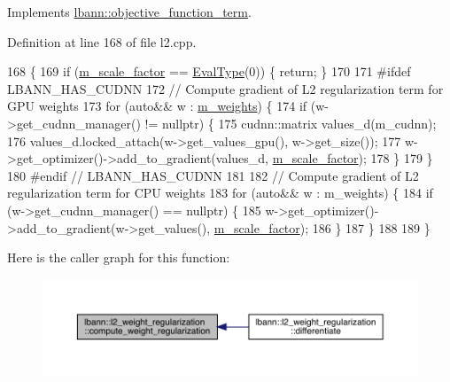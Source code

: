 Implements \hyperlink{classlbann_1_1objective__function__term_a134cf89caed45527bbe9d811a0b93dfc}{lbann\+::objective\+\_\+function\+\_\+term}.



Definition at line 168 of file l2.\+cpp.


\begin{DoxyCode}
168                                                              \{
169   \textcolor{keywordflow}{if} (\hyperlink{classlbann_1_1objective__function__term_a59a544b8ff0455ed5091de3bf0d81c3c}{m\_scale\_factor} == \hyperlink{base_8hpp_a3266f5ac18504bbadea983c109566867}{EvalType}(0)) \{ \textcolor{keywordflow}{return}; \}
170 
171 \textcolor{preprocessor}{#ifdef LBANN\_HAS\_CUDNN}
172   \textcolor{comment}{// Compute gradient of L2 regularization term for GPU weights}
173   \textcolor{keywordflow}{for} (\textcolor{keyword}{auto}&& w : \hyperlink{classlbann_1_1objective__function__term_a1d601c29153ae9cb54c585887608f2bf}{m\_weights}) \{
174     \textcolor{keywordflow}{if} (w->get\_cudnn\_manager() != \textcolor{keyword}{nullptr}) \{
175       cudnn::matrix values\_d(m\_cudnn);
176       values\_d.locked\_attach(w->get\_values\_gpu(), w->get\_size());
177       w->get\_optimizer()->add\_to\_gradient(values\_d, \hyperlink{classlbann_1_1objective__function__term_a59a544b8ff0455ed5091de3bf0d81c3c}{m\_scale\_factor});
178     \}
179   \}
180 \textcolor{preprocessor}{#endif // LBANN\_HAS\_CUDNN}
181 
182   \textcolor{comment}{// Compute gradient of L2 regularization term for CPU weights}
183   \textcolor{keywordflow}{for} (\textcolor{keyword}{auto}&& w : m\_weights) \{
184     \textcolor{keywordflow}{if} (w->get\_cudnn\_manager() == \textcolor{keyword}{nullptr}) \{
185       w->get\_optimizer()->add\_to\_gradient(w->get\_values(), \hyperlink{classlbann_1_1objective__function__term_a59a544b8ff0455ed5091de3bf0d81c3c}{m\_scale\_factor});
186     \}
187   \}
188 
189 \}
\end{DoxyCode}
Here is the caller graph for this function\+:\nopagebreak
\begin{figure}[H]
\begin{center}
\leavevmode
\includegraphics[width=350pt]{classlbann_1_1l2__weight__regularization_a1dce8a486660335097f5ad239b343e39_icgraph}
\end{center}
\end{figure}
\mbox{\label{classlbann_1_1l2__weight__regularization_ac00a969efe6c3fd911a0d69428bb5b95}} 
